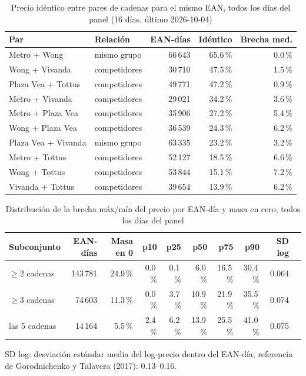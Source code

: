 
\begin{table}[htbp]
\caption{Precio id\'entico entre pares de cadenas para el mismo EAN, todos los d\'ias del panel (16 d\'ias, \'ultimo 2026-10-04)}
\label{tab:identidad}
\centering\scriptsize\setlength{\tabcolsep}{3pt}
\begin{tabular}{@{}llrrr@{}}
\toprule
Par & Relaci\'on & EAN-d\'ias & Id\'entico & Brecha med. \\
\midrule
Metro + Wong & mismo grupo & 66\,643 & 65.6\,\% & 0.0\,\% \\
Wong + Vivanda & competidores & 30\,710 & 47.5\,\% & 1.5\,\% \\
Plaza Vea + Tottus & competidores & 49\,771 & 47.2\,\% & 0.9\,\% \\
Metro + Vivanda & competidores & 29\,021 & 34.2\,\% & 3.6\,\% \\
Metro + Plaza Vea & competidores & 35\,906 & 27.2\,\% & 5.4\,\% \\
Wong + Plaza Vea & competidores & 36\,539 & 24.3\,\% & 6.2\,\% \\
Plaza Vea + Vivanda & mismo grupo & 63\,335 & 23.2\,\% & 3.2\,\% \\
Metro + Tottus & competidores & 52\,127 & 18.5\,\% & 6.6\,\% \\
Wong + Tottus & competidores & 53\,844 & 15.1\,\% & 7.2\,\% \\
Vivanda + Tottus & competidores & 39\,654 & 13.9\,\% & 6.2\,\% \\
\bottomrule\end{tabular}\end{table}

\begin{table}[t]
\caption{Distribuci\'on de la brecha m\'ax/m\'in del precio por EAN-d\'ia y masa en cero, todos los d\'ias del panel}
\label{tab:brecha}
\centering\scriptsize\setlength{\tabcolsep}{4pt}
\begin{tabular}{@{}lrrrrrrrrr@{}}
\toprule
Subconjunto & EAN-d\'ias & Masa en 0 & p10 & p25 & p50 & p75 & p90 & SD log \\
\midrule
$\geq 2$ cadenas & 143\,781 & 24.9\,\% & 0.0\,\% & 0.1\,\% & 6.0\,\% & 16.5\,\% & 30.4\,\% & 0.064 \\
$\geq 3$ cadenas & 74\,603 & 11.3\,\% & 0.0\,\% & 3.7\,\% & 10.9\,\% & 21.9\,\% & 35.5\,\% & 0.074 \\
las 5 cadenas & 14\,164 & 5.5\,\% & 2.4\,\% & 6.2\,\% & 13.9\,\% & 25.5\,\% & 41.0\,\% & 0.075 \\
\bottomrule\end{tabular}
\par\smallskip\raggedright\scriptsize SD log: desviaci\'on est\'andar media del log-precio dentro del EAN-d\'ia; referencia de Gorodnichenko y Talavera (2017): 0.13--0.16.
\end{table}

